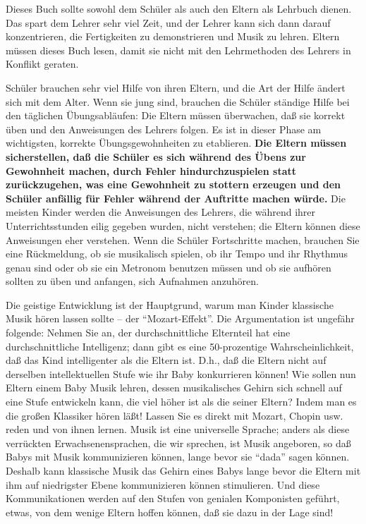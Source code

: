 Dieses Buch sollte sowohl dem Schüler als auch den Eltern als Lehrbuch dienen.
Das spart dem Lehrer sehr viel Zeit, und der Lehrer kann sich dann darauf konzentrieren, die Fertigkeiten zu demonstrieren und Musik zu lehren.
Eltern müssen dieses Buch lesen, damit sie nicht mit den Lehrmethoden des Lehrers in Konflikt geraten.

Schüler brauchen sehr viel Hilfe von ihren Eltern, und die Art der Hilfe ändert sich mit dem Alter.
Wenn sie jung sind, brauchen die Schüler ständige Hilfe bei den täglichen Übungsabläufen: Die Eltern müssen überwachen, daß sie korrekt üben und den Anweisungen des Lehrers folgen.
Es ist in dieser Phase am wichtigsten, korrekte Übungsgewohnheiten zu etablieren.
\textbf{Die Eltern müssen sicherstellen, daß die Schüler es sich während des Übens zur Gewohnheit machen, durch Fehler hindurchzuspielen statt zurückzugehen, was eine Gewohnheit zu stottern erzeugen und den Schüler anfällig für Fehler während der Auftritte machen würde.}
Die meisten Kinder werden die Anweisungen des Lehrers, die während ihrer Unterrichtsstunden eilig gegeben wurden, nicht verstehen; die Eltern können diese Anweisungen eher verstehen.
Wenn die Schüler Fortschritte machen, brauchen Sie eine Rückmeldung, ob sie musikalisch spielen, ob ihr Tempo und ihr Rhythmus genau sind oder ob sie ein Metronom benutzen müssen und ob sie aufhören sollten zu üben und anfangen, sich Aufnahmen anzuhören.

Die geistige Entwicklung ist der Hauptgrund, warum man Kinder klassische Musik hören lassen sollte -- der \enquote{Mozart-Effekt}.
Die Argumentation ist ungefähr folgende:
Nehmen Sie an, der durchschnittliche Elternteil hat eine durchschnittliche Intelligenz; dann gibt es eine 50-prozentige Wahrscheinlichkeit, daß das Kind intelligenter als die Eltern ist.
D.h., daß die Eltern nicht auf derselben intellektuellen Stufe wie ihr Baby konkurrieren können!
Wie sollen nun Eltern einem Baby Musik lehren, dessen musikalisches Gehirn sich schnell auf eine Stufe entwickeln kann, die viel höher ist als die seiner Eltern?
Indem man es die großen Klassiker hören läßt!
Lassen Sie es direkt mit Mozart, Chopin usw. reden und von ihnen lernen.
Musik ist eine universelle Sprache; anders als diese verrückten Erwachsenensprachen, die wir sprechen, ist Musik angeboren, so daß Babys mit Musik kommunizieren können, lange bevor sie \enquote{dada} sagen können.
Deshalb kann klassische Musik das Gehirn eines Babys lange bevor die Eltern mit ihm auf niedrigster Ebene kommunizieren können stimulieren.
Und diese Kommunikationen werden auf den Stufen von genialen Komponisten geführt, etwas, von dem wenige Eltern hoffen können, daß sie dazu in der Lage sind!

